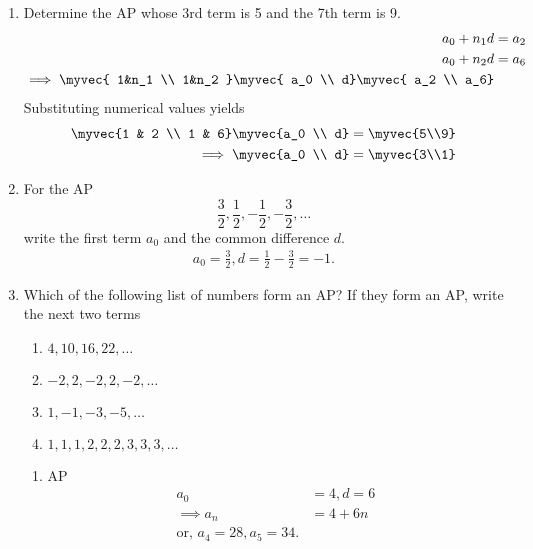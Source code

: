 \begin{enumerate}[label=\thesubsection.\arabic*, ref=\thesubsection.\theenumi]
\item Determine the AP whose 3rd term is 5 and the 7th term is 9.
	\\
	\solution
\begin{align}
	a_0+n_1d &= a_2
	\\
	a_0+n_2d &= a_6
	\\
	\implies 
	\myvec{
	1&n_1 
	\\
	1&n_2 
}
	\myvec{
a_0
\\
	d}
	\myvec{
a_2
\\
	a_6}
       \end{align}
Substituting numerical values 
yields
\begin{align}
	\myvec{1 & 2 \\ 1 & 6}
	\myvec{a_0 \\ d}
	&=
	\myvec{5\\9}
	\\
	\implies \myvec{a_0 \\ d}
	&=
	\myvec{3\\1}
\end{align}
%
\item For the AP 
$$\frac{3}{2}, \frac{1}{2}, -\frac{1}{2}, -\frac{3}{2}, \dots $$ write the first term $a_0$ and the common difference $d$.
\\
\solution
\begin{align}
	a_0 = \frac{3}{2}, d=  \frac{1}{2}-\frac{3}{2} = -1.
\end{align}
\item Which of the following list of numbers form an AP? If they form an AP, 
write the next two terms 
		\begin{multicols}{2}
\begin{enumerate}
\item $4, 10, 16, 22, \dots$ 
\item $-2, 2, -2, 2, -2, \dots$
\item $1, -1, -3, -5, \dots$ 
\item $1, 1, 1, 2, 2, 2, 3, 3, 3, \dots$
\end{enumerate}
\end{multicols}
\begin{enumerate}
	\item AP
\begin{align}
	a_0 &= 4, d = 6
	\\
	\implies a_n &= 4 +6n
	\\
	\text{or, }a_4 = 28, a_5 = 34.

\end{align}
\end{enumerate}
\end{enumerate}
